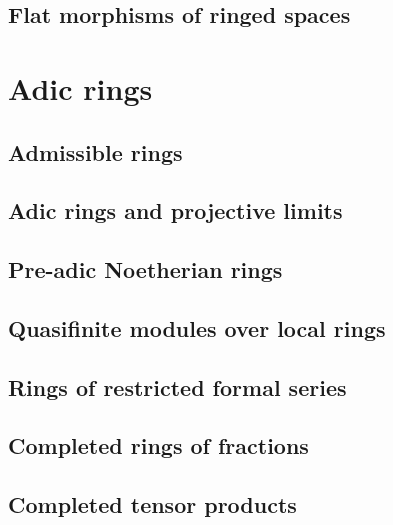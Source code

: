 \documentclass[10pt,oneside]{amsart}
\begin{document}
        \subsection{Flat morphisms of ringed spaces}
        

    \section{Adic rings}

        \subsection{Admissible rings}
        

        \subsection{Adic rings and projective limits}
        

        \subsection{Pre-adic Noetherian rings}
        

        \subsection{Quasifinite modules over local rings}
        

        \subsection{Rings of restricted formal series}
        

        \subsection{Completed rings of fractions}
        

        \subsection{Completed tensor products}
        
\end{document}
